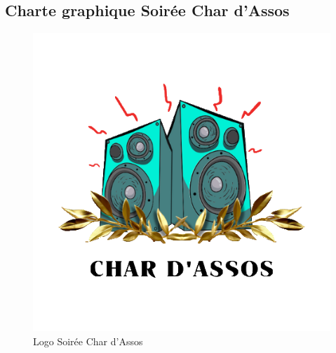 \subsection*{Charte graphique Soirée Char d'Assos}\label{subsec:charte-char-dassos}

\begin{figure}[!h]
    \begin{center}
        \includegraphics[scale=0.5]{ressources/Char_Dassos/C_2}
        \caption{Logo Soirée Char d'Assos \label{fig:logoCharDassos}}
    \end{center}
\end{figure}

